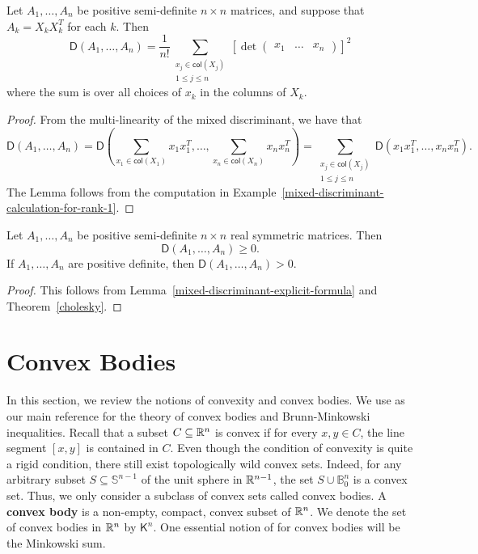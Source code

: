 \documentclass{puthesis-UG}
\begin{document}
\begin{lem}  \label{mixed-discriminant-explicit-formula}
	Let $A_1, \ldots, A_n$ be positive semi-definite $n \times n$ matrices, and suppose that $A_k = X_k X_k^T$ for each $k$. Then
	\[
		\mathsf{D} (A_1, \ldots, A_n) = \frac{1}{n!} \sum_{\substack{x_j \in \mathsf{col}(X_j) \\ 1 \leq j \leq n}} \left [ \det \begin{pmatrix} x_1 & \ldots & x_n \end{pmatrix} \right ]^2
	\]
	where the sum is over all choices of $x_k$ in the columns of $X_k$. 
\end{lem}

\begin{proof}
	From the multi-linearity of the mixed discriminant, we have that 
	\[
		\mathsf{D}(A_1, \ldots, A_n) = \mathsf{D} \left ( \sum_{x_1 \in \mathsf{col}(X_1)} x_1x_1^T, \ldots, \sum_{x_n \in \mathsf{col}(X_n)} x_nx_n^T \right ) = \sum_{\substack{x_j \in \mathsf{col}(X_j) \\ 1 \leq j \leq n}} \mathsf{D} (x_1x_1^T, \ldots, x_nx_n^T).
	\]
	The Lemma follows from the computation in Example~\ref{mixed-discriminant-calculation-for-rank-1}. 
\end{proof}

\begin{cor} \label{final-positivity-corollary}
	Let $A_1, \ldots, A_n$ be positive semi-definite $n \times n$ real symmetric matrices. Then 
	\[
		\mathsf{D}(A_1, \ldots, A_n) \geq 0.
	\]	
	If $A_1, \ldots, A_n$ are positive definite, then $\mathsf{D}(A_1, \ldots, A_n) > 0$. 
\end{cor}

\begin{proof}
	This follows from Lemma~\ref{mixed-discriminant-explicit-formula} and Theorem~\ref{cholesky}. 
\end{proof}

\section{Convex Bodies}

In this section, we review the notions of convexity and convex bodies. We use \cite{schneider_2013} as our main reference for the theory of convex bodies and Brunn-Minkowski inequalities. Recall that a subset $C \subseteq \mathbb{R}^n$ is convex if for every $x, y \in C$, the line segment $[x, y]$ is contained in $C$. Even though the condition of convexity is quite a rigid condition, there still exist topologically wild convex sets. Indeed, for any arbitrary subset $S \subseteq \mathbb{S}^{n-1}$ of the unit sphere in $\mathbb{R}^{n-1}$, the set $S \cup \mathbb{B}_0^n$ is a convex set. Thus, we only consider a subclass of convex sets called convex bodies. A \textbf{convex body} is a non-empty, compact, convex subset of $\mathbb{R}^n$. We denote the set of convex bodies in $\mathbb{R}^n$ by $\mathsf{K}^n$. One essential notion of for convex bodies will be the Minkowski sum. 
\end{document}
